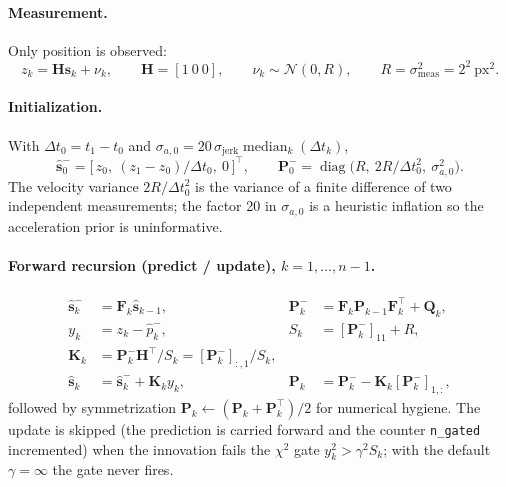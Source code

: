 \documentclass[11pt,a4paper]{article}
\newcommand{\code}[1]{\texttt{\small #1}}
\begin{document}
\paragraph{Measurement.} Only position is observed:
\begin{equation}
  z_k = \bm{H}\bm{s}_k + \nu_k,
  \qquad \bm{H} = [1\ 0\ 0],
  \qquad \nu_k \sim \mathcal{N}(0, R),
  \qquad R = \sigma_{\text{meas}}^2 = 2^2\ \text{px}^2 .
  \label{eq:meas}
\end{equation}

\paragraph{Initialization.} With $\Delta t_0 = t_1 - t_0$ and
$\sigma_{a,0} = 20\,\sigma_{\text{jerk}}\operatorname{median}_k(\Delta t_k)$,
\begin{equation}
  \hat{\bm{s}}_0^- = \big[\, z_0,\ (z_1 - z_0)/\Delta t_0,\ 0 \,\big]^{\!\top},
  \qquad
  \bm{P}_0^- = \operatorname{diag}\!\big(R,\ 2R/\Delta t_0^2,\ \sigma_{a,0}^2\big).
  \label{eq:init}
\end{equation}
The velocity variance $2R/\Delta t_0^2$ is the variance of a finite difference
of two independent measurements; the factor 20 in $\sigma_{a,0}$ is a heuristic
inflation so the acceleration prior is uninformative.

\paragraph{Forward recursion (predict / update), $k = 1, \dots, n-1$.}
\begin{align}
  \hat{\bm{s}}_k^- &= \bm{F}_k \hat{\bm{s}}_{k-1},
  &\bm{P}_k^- &= \bm{F}_k \bm{P}_{k-1} \bm{F}_k^{\!\top} + \bm{Q}_k, \label{eq:kf1}\\
  y_k &= z_k - \hat p_k^-,
  &S_k &= [\bm{P}_k^-]_{11} + R, \label{eq:kf2}\\
  \bm{K}_k &= \bm{P}_k^- \bm{H}^{\!\top} / S_k = [\bm{P}_k^-]_{:,1}/S_k, & & \label{eq:kf3}\\
  \hat{\bm{s}}_k &= \hat{\bm{s}}_k^- + \bm{K}_k y_k,
  &\bm{P}_k &= \bm{P}_k^- - \bm{K}_k [\bm{P}_k^-]_{1,:}, \label{eq:kf4}
\end{align}
followed by symmetrization $\bm{P}_k \leftarrow (\bm{P}_k + \bm{P}_k^{\!\top})/2$
for numerical hygiene. The update is skipped (the prediction is carried forward
and the counter \code{n\_gated} incremented) when the innovation fails the
$\chi^2$ gate $y_k^2 > \gamma^2 S_k$; with the default $\gamma = \infty$ the gate
never fires.
\end{document}
